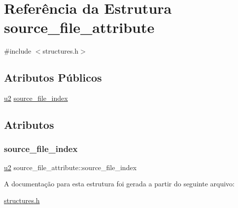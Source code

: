 \hypertarget{structsource__file__attribute}{}\section{Referência da Estrutura source\+\_\+file\+\_\+attribute}
\label{structsource__file__attribute}


{\ttfamily \#include $<$structures.\+h$>$}

\subsection*{Atributos Públicos}
\begin{DoxyCompactItemize}
\item 
\hyperlink{lista__operandos_8h_a732cde1300aafb73b0ea6c2558a7a54f}{u2} \hyperlink{structsource__file__attribute_af0056307fb509ddd8301100fd2cd84d9}{source\+\_\+file\+\_\+index}
\end{DoxyCompactItemize}


\subsection{Atributos}
\mbox{\label{structsource__file__attribute_af0056307fb509ddd8301100fd2cd84d9}} 
\subsubsection{\texorpdfstring{source\+\_\+file\+\_\+index}{source\_file\_index}}
{\footnotesize\ttfamily \hyperlink{lista__operandos_8h_a732cde1300aafb73b0ea6c2558a7a54f}{u2} source\+\_\+file\+\_\+attribute\+::source\+\_\+file\+\_\+index}



A documentação para esta estrutura foi gerada a partir do seguinte arquivo\+:\begin{DoxyCompactItemize}
\item 
\hyperlink{structures_8h}{structures.\+h}\end{DoxyCompactItemize}
